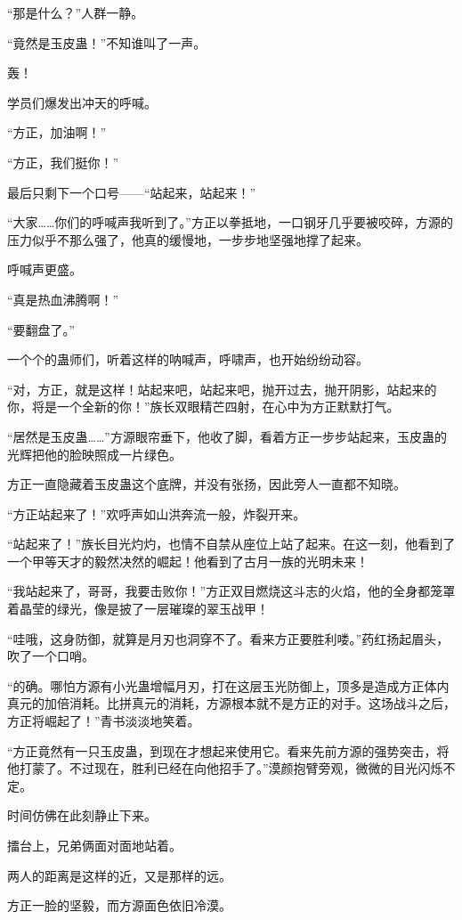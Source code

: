 \begin{this_body}
“那是什么？”人群一静。

“竟然是玉皮蛊！”不知谁叫了一声。

轰！

学员们爆发出冲天的呼喊。

“方正，加油啊！”

“方正，我们挺你！”

最后只剩下一个口号——“站起来，站起来！”

“大家……你们的呼喊声我听到了。”方正以拳抵地，一口钢牙几乎要被咬碎，方源的压力似乎不那么强了，他真的缓慢地，一步步地坚强地撑了起来。

呼喊声更盛。

“真是热血沸腾啊！”

“要翻盘了。”

一个个的蛊师们，听着这样的呐喊声，呼啸声，也开始纷纷动容。

“对，方正，就是这样！站起来吧，站起来吧，抛开过去，抛开阴影，站起来的你，将是一个全新的你！”族长双眼精芒四射，在心中为方正默默打气。

“居然是玉皮蛊……”方源眼帘垂下，他收了脚，看着方正一步步站起来，玉皮蛊的光辉把他的脸映照成一片绿色。

方正一直隐藏着玉皮蛊这个底牌，并没有张扬，因此旁人一直都不知晓。

“方正站起来了！”欢呼声如山洪奔流一般，炸裂开来。

“站起来了！”族长目光灼灼，也情不自禁从座位上站了起来。在这一刻，他看到了一个甲等天才的毅然决然的崛起！他看到了古月一族的光明未来！

“我站起来了，哥哥，我要击败你！”方正双目燃烧这斗志的火焰，他的全身都笼罩着晶莹的绿光，像是披了一层璀璨的翠玉战甲！

“哇哦，这身防御，就算是月刃也洞穿不了。看来方正要胜利喽。”药红扬起眉头，吹了一个口哨。

“的确。哪怕方源有小光蛊增幅月刃，打在这层玉光防御上，顶多是造成方正体内真元的加倍消耗。比拼真元的消耗，方源根本就不是方正的对手。这场战斗之后，方正将崛起了！”青书淡淡地笑着。

“方正竟然有一只玉皮蛊，到现在才想起来使用它。看来先前方源的强势突击，将他打蒙了。不过现在，胜利已经在向他招手了。”漠颜抱臂旁观，微微的目光闪烁不定。

时间仿佛在此刻静止下来。

擂台上，兄弟俩面对面地站着。

两人的距离是这样的近，又是那样的远。

方正一脸的坚毅，而方源面色依旧冷漠。


\end{this_body}
